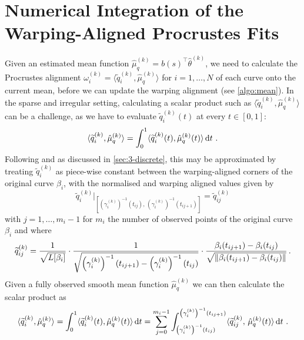 \section{Numerical Integration of the Warping-Aligned Procrustes Fits}
\label{sec:3-pfits}
Given an estimated mean function $\hat\mu_q^{(k)} = b(s)^\top\hat\theta^{(k)}$, we need to calculate the Procrustes alignment $\omega_i^{(k)} = \langle \widetilde q_i^{(k)}, \hat\mu_q^{(k)} \rangle$ for $i = 1,\dots,N$ of each curve onto the current mean, before we can update the warping alignment (see \cref{algo:mean}).
In the sparse and irregular setting, calculating a scalar product such as $\langle \widetilde q_i^{(k)}, \hat\mu_q^{(k)} \rangle$ can be a challenge, as we have to evaluate $\widetilde q_i^{(k)}(t)$ at every $t \in [0,1]$:
\begin{equation}
\langle \widetilde q_i^{(k)}, \hat\mu_q^{(k)} \rangle =
  \int_0^1 \langle \widetilde q_i^{(k)}(t), \hat\mu_q^{(k)}(t) \rangle \mathop{\mathrm{d}t}\,.
\end{equation}
Following \cite{Steyer2021} and as discussed in \cref{sec:3-discrete}, this may be approximated by treating $\widetilde q_i^{(k)}$ as piece-wise constant between the warping-aligned corners of the original curve $\beta_i$, with the normalised and warping aligned values given by
\begin{equation}
   \widetilde q_i^{(k)} \Big\rvert_{\left[\left(\gamma_i^{(k)}\right)^{-1}(t_{ij}),\, \left(\gamma_i^{(k)} \right)^{-1}(t_{ij+1})\right]} =
  \widetilde q_{ij}^{(k)}
\end{equation}
with $j = 1, \dots, m_i - 1$ for $m_i$ the number of observed points of the original curve $\beta_i$ and where
\begin{equation}
  \widetilde q_{ij}^{(k)} = 
  \frac{1}{\sqrt{L[\beta_i]}}\cdot \frac{1}{\sqrt{\left(\gamma_i^{(k)}\right)^{-1}(t_{ij+1}) - \left(\gamma_i^{(k)}\right)^{-1}(t_{ij})}} \cdot \frac{\beta_i(t_{ij+1}) - \beta_i(t_{ij})}{\sqrt{\lVert\beta_i(t_{ij+1}) - \beta_i(t_{ij})\rVert}} \,.
\end{equation}
Given a fully observed smooth mean function $\hat\mu_q^{(k)}$ we can then calculate the scalar product as
\begin{equation}
\langle \widetilde q_i^{(k)}, \hat\mu_q^{(k)} \rangle =
  \int_0^1 \langle \widetilde q_i^{(k)}(t), \hat\mu_q^{(k)}(t) \rangle \mathop{\mathrm{d}t} =
  \sum_{j=0}^{m_i-1} \int_{\left(\gamma_i^{(k)}\right)^{-1}(t_{ij})}^{\left(\gamma_i^{(k)}\right)^{-1}(t_{ij+1})} \langle \widetilde q_{ij}^{(k)},\, \hat\mu_q^{(k)} (t) \rangle \mathop{\mathrm{d}t} \,.
\end{equation}
